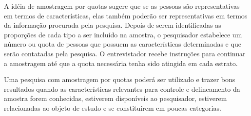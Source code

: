 A idéia de amostragem por quotas sugere que se as pessoas são representativas em termos de características, elas também poderão ser representativas em termos da informação procurada pela pesquisa. Depois de serem identificadas as proporções de cada tipo a ser incluído na amostra, o pesquisador estabelece um número ou quota de pessoas que possuem as características determinadas e que serão contatadas pela pesquisa. O entrevistador recebe instruções para continuar a amostragem até que a quota necessária tenha sido atingida em cada estrato.\vskip0.3cm


Uma pesquisa com amostragem por quotas poderá ser utilizado e trazer bons resultados quando as características relevantes para controle e delineamento da amostra forem conhecidas, estiverem disponíveis ao pesquisador, estiverem relacionadas ao objeto de estudo e se constituírem em poucas categorias.
